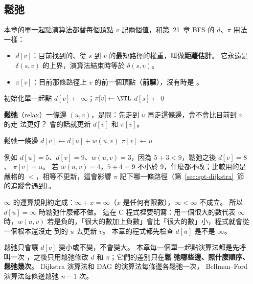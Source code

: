 \subsection{鬆弛}

本章的單一起點演算法都替每個頂點 $v$ 記兩個值，和第~21~章 BFS 的 $d$、$\pi$ 用法一樣：
\begin{itemize}
\item $d[v]$：目前找到的、從 $s$ 到 $v$ 的最短路徑的權重，叫做\textbf{距離估計}。 它永遠是
$\delta(s, v)$ 的上界，演算法結束時等於 $\delta(s, v)$。
\item $\pi[v]$：目前那條路徑上 $v$ 的前一個頂點（\textbf{前驅}），沒有時是 \NIL。
\end{itemize}

\begin{pseudo}[label=alg:spt-init]{初始化單一起點}
        \State $d[v] \gets \infty$；$\pi[v] \gets \NIL$
    \EndFor
    \State $d[s] \gets 0$
\EndProcedure
\end{pseudo}

\textbf{鬆弛}（relax）一條邊 $(u, v)$，是問：先走到 $u$ 再走這條邊，會不會比目前到 $v$ 的走
法更好？ 會的話就更新 $d[v]$ 和 $\pi[v]$。

\begin{pseudo}[label=alg:spt-relax]{鬆弛一條邊}
        \State $d[v] \gets d[u] + w(u, v)$
        \State $\pi[v] \gets u$
    \EndIf
\EndProcedure
\end{pseudo}

例如 $d[u] = 5$、$d[v] = 9$、$w(u, v) = 3$，因為 $5 + 3 < 9$，鬆弛之後 $d[v] = 8$、
$\pi[v] = u$。 若 $w(u, v) = 4$，$5 + 4 = 9$ 不小於 $9$，什麼都不改；比較用的是嚴格的
$<$，相等不更新，這會影響 $\pi$ 記下哪一條路徑（第~\ref{sec:spt-dijkstra}~節的追蹤會遇到）。

$\infty$ 的運算規則約定成：$\infty + x = \infty$（$x$ 是任何有限數），$\infty < \infty$ 不成立。
所以 $d[u] = \infty$ 時鬆弛什麼都不做。 這在 C 程式裡要明寫：用一個很大的數代表 $\infty$
時，$w(u, v)$ 若是負的，「很大的數加上負數」會比「很大的數」小，程式就會從一個根本還沒走
到的 $u$ 去更新 $v$。 本章的程式都先檢查 $d[u]$ 是不是 $\infty$。

鬆弛只會讓 $d[v]$ 變小或不變，不會變大。 本章每一個單一起點演算法都是先呼叫一次
，之後只用鬆弛修改 $d$ 和 $\pi$；它們的差別只在\textbf{鬆
弛哪些邊、照什麼順序、鬆弛幾次}。 Dijkstra 演算法和 DAG 的演算法每條邊各鬆弛一次，
Bellman--Ford 演算法每條邊鬆弛 $n - 1$ 次。

